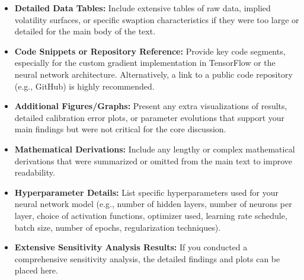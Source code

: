 \begin{itemize}
    \item \textbf{Detailed Data Tables:} Include extensive tables of raw data, implied volatility surfaces, or specific swaption characteristics if they were too large or detailed for the main body of the text.
    \item \textbf{Code Snippets or Repository Reference:} Provide key code segments, especially for the custom gradient implementation in TensorFlow or the neural network architecture. Alternatively, a link to a public code repository (e.g., GitHub) is highly recommended.
    \item \textbf{Additional Figures/Graphs:} Present any extra visualizations of results, detailed calibration error plots, or parameter evolutions that support your main findings but were not critical for the core discussion.
    \item \textbf{Mathematical Derivations:} Include any lengthy or complex mathematical derivations that were summarized or omitted from the main text to improve readability.
    \item \textbf{Hyperparameter Details:} List specific hyperparameters used for your neural network model (e.g., number of hidden layers, number of neurons per layer, choice of activation functions, optimizer used, learning rate schedule, batch size, number of epochs, regularization techniques).
    \item \textbf{Extensive Sensitivity Analysis Results:} If you conducted a comprehensive sensitivity analysis, the detailed findings and plots can be placed here.
\end{itemize}